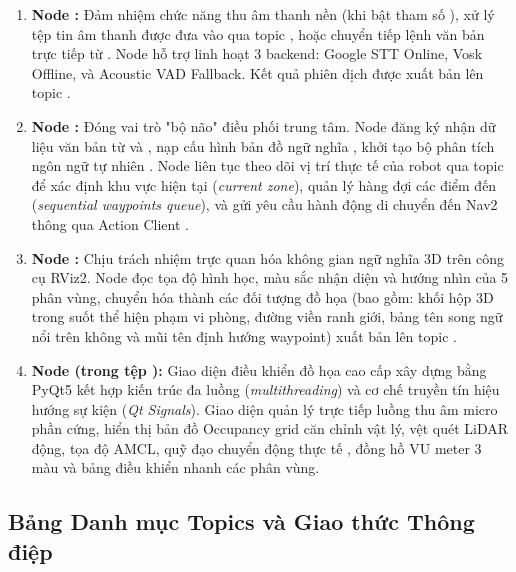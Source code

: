 \begin{enumerate}[label=\textbf{\arabic*.}]
    \item \textbf{Node :}
    Đảm nhiệm chức năng thu âm thanh nền (khi bật tham số ), xử lý tệp tin âm thanh  được đưa vào qua topic , hoặc chuyển tiếp lệnh văn bản trực tiếp từ . Node hỗ trợ linh hoạt 3 backend: Google STT Online, Vosk Offline, và Acoustic VAD Fallback. Kết quả phiên dịch được xuất bản lên topic .
    
    \item \textbf{Node :}
    Đóng vai trò "bộ não" điều phối trung tâm. Node đăng ký nhận dữ liệu văn bản từ  và , nạp cấu hình bản đồ ngữ nghĩa , khởi tạo bộ phân tích ngôn ngữ tự nhiên . Node liên tục theo dõi vị trí thực tế của robot qua topic  để xác định khu vực hiện tại (\textit{current zone}), quản lý hàng đợi các điểm đến (\textit{sequential waypoints queue}), và gửi yêu cầu hành động di chuyển đến Nav2 thông qua Action Client .
    
    \item \textbf{Node :}
    Chịu trách nhiệm trực quan hóa không gian ngữ nghĩa 3D trên công cụ RViz2. Node đọc tọa độ hình học, màu sắc nhận diện và hướng nhìn của 5 phân vùng, chuyển hóa thành các đối tượng đồ họa  (bao gồm: khối hộp 3D trong suốt thể hiện phạm vi phòng, đường viền ranh giới, bảng tên song ngữ nổi trên không và mũi tên định hướng waypoint) xuất bản lên topic .
    
    \item \textbf{Node  (trong tệp ):}
    Giao diện điều khiển đồ họa cao cấp xây dựng bằng PyQt5 kết hợp kiến trúc đa luồng (\textit{multithreading}) và cơ chế truyền tín hiệu hướng sự kiện (\textit{Qt Signals}). Giao diện quản lý trực tiếp luồng thu âm micro phần cứng, hiển thị bản đồ Occupancy grid căn chỉnh vật lý, vệt quét LiDAR động, tọa độ AMCL, quỹ đạo chuyển động thực tế , đồng hồ VU meter 3 màu và bảng điều khiển nhanh các phân vùng.
\end{enumerate}

\subsection{Bảng Danh mục Topics và Giao thức Thông điệp}

